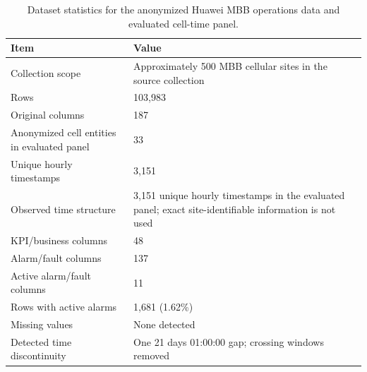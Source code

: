 \begin{table}[t]
\centering
\caption{Dataset statistics for the anonymized Huawei MBB operations data and evaluated cell-time panel.}
\label{tab:data_stats}
\begin{tabularx}{\textwidth}{lX}
\toprule
Item & Value \\
\midrule
Collection scope & Approximately 500 MBB cellular sites in the source collection \\
Rows & 103,983 \\
Original columns & 187 \\
Anonymized cell entities in evaluated panel & 33 \\
Unique hourly timestamps & 3,151 \\
Observed time structure & 3,151 unique hourly timestamps in the evaluated panel; exact site-identifiable information is not used \\
KPI/business columns & 48 \\
Alarm/fault columns & 137 \\
Active alarm/fault columns & 11 \\
Rows with active alarms & 1,681 (1.62\%) \\
Missing values & None detected \\
Detected time discontinuity & One 21 days 01:00:00 gap; crossing windows removed \\
\bottomrule
\end{tabularx}

\end{table}
